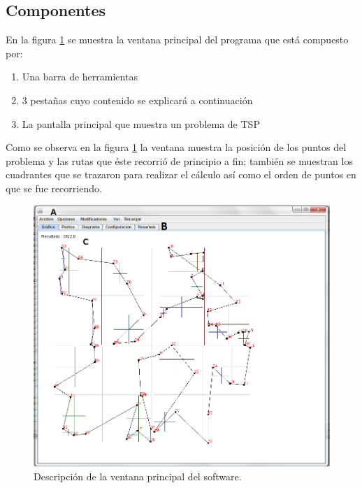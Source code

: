 \subsection{Componentes} 
En la figura \ref {fig:Software_1} se muestra la ventana principal del programa que está compuesto por:
    \begin{enumerate}[label=\Alph*.-]
    \item Una barra de herramientas
    \item 3 pestañas cuyo contenido se explicará a continuación
    \item La pantalla principal que muestra un problema de TSP
    \end{enumerate}
\hspace*{1cm}Como se observa en la figura \ref {fig:Software_1} la ventana muestra la posición de los puntos del problema y las rutas que éste recorrió de principio a fin; también se muestran los cuadrantes que se trazaron para realizar el cálculo así como el orden de puntos en que se fue recorriendo.\\ 
     \begin{figure}[hbtp]
        \centering
            \includegraphics[width=1\textwidth]{Software/Imagenes/Software_1.png}
            \caption{Descripción de la ventana principal del software.}
            \label{fig:Software_1}
    \end{figure}

